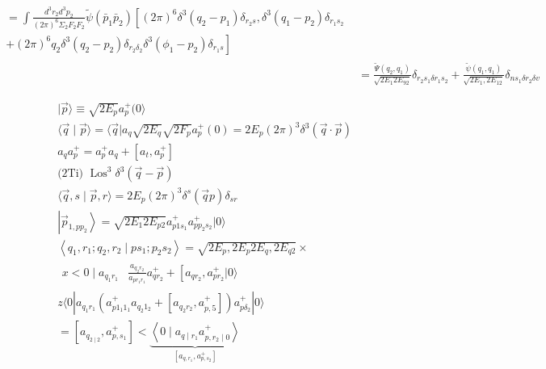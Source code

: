 \documentclass[10pt]{article}
\begin{document}
\[\begin{aligned}
\begin{array}{r}
=\int \frac{d^{3} r_{2} d^{3} p_{2}}{(2 \pi)^{6} \Sigma_{2} F_{2} F_{2}} \tilde{\psi}\left(\bar{p}_{1} \bar{p}_{2}\right)\left[(2 \pi)^{6} \delta^{3}\left(q_{2}-p_{1}\right) \delta_{r_{2} s}, \delta^{3}\left(q_{1}-p_{2}\right) \delta_{r_{1} s_{2}}\right. \\
\left.+(2 \pi)^{6} q_{2} \delta^{3}\left(q_{2}-p_{2}\right) \delta_{r_{2} \delta_{2}} \delta^{3}\left(\phi_{1}-p_{2}\right) \delta_{r_{1} s}\right]
\end{array} \\
& =\frac{\tilde{\Psi}\left(q_{2}, q_{1}\right)}{\sqrt{2 E_{1} 2 E_{92}}} \delta_{r_{2} s_{1} \delta r_{1} s_{2}}+\frac{\tilde{\psi}\left(q_{1}, q_{1}\right)}{\sqrt{2 E_{1}, 2 E_{12}}} \delta_{n s_{1} \delta r_{2} \delta v}
\end{aligned}
\]

\[
\begin{aligned}
& |\vec{p}\rangle \equiv \sqrt{2 E_{p}} a_{p}^{+}(0\rangle \\
& \langle\vec{q} \mid \vec{p}\rangle=\langle\vec{q}| a_{q} \sqrt{2 E_{q}} \sqrt{2 F_{p}} a_{p}^{+}(0)=2 E_{p}(2 \pi)^{3} \delta^{3}(\vec{q} \cdot \vec{p}) \\
& a_{q} a_{p}^{+}=a_{p}^{+} a_{q}+\left[a_{t}, a_{p}^{+}\right] \\
& \text {(2Ti) } \operatorname{Los}^{3} \delta^{3}(\vec{q}-\vec{p}) \\
& \langle\vec{q}, s \mid \vec{p}, r\rangle=2 E_{p}(2 \pi)^{3} \delta^{s}(\vec{q} p) \delta_{s r} \\
& \left|\vec{p}_{1, p p_{2}}\right\rangle=\sqrt{2 E_{1} 2 E_{p 2}} a_{p 1 s_{1}}^{+} a_{p p_{2} s_{2}}^{+}|0\rangle \\
& \left\langle q_{1}, r_{1} ; q_{2}, r_{2} \mid p s_{1} ; p_{2} s_{2}\right\rangle=\sqrt{2 E_{p}, 2 E_{p} 2 E_{q}, 2 E_{q 2}} \times \\
& \begin{aligned}
x<0 \mid a_{q_{1} r_{1}} & \frac{a_{q_{2} r_{2}}}{a_{p r_{1} r_{1}}} a_{q r_{2}}^{+}+\left[a_{q r_{2}}, a_{p r_{2}}^{+}|0\rangle\right.
\end{aligned} \\
& z\langle 0| a_{q_{1} r_{1}}\left(a_{p 1_{1} 1_{1}}^{+} a_{q_{2} 1_{2}}+\left[a_{q_{2} r_{2}}, a_{p, 5}^{+}\right]\right) a_{p \delta_{2}}^{+}|0\rangle \\
& =\left[a_{q_{2 \mid 2}}, a_{p, s_{1}}^{+}\right]<\underbrace{\left\langle 0 \mid a_{q \mid r_{1}} a_{p, r_{2} \mid 0}^{+}\right\rangle}_{\left[a_{q, r_{1}}, a_{p, s_{2}}^{+}\right]} \\

\end{aligned}\]
\end{document}
